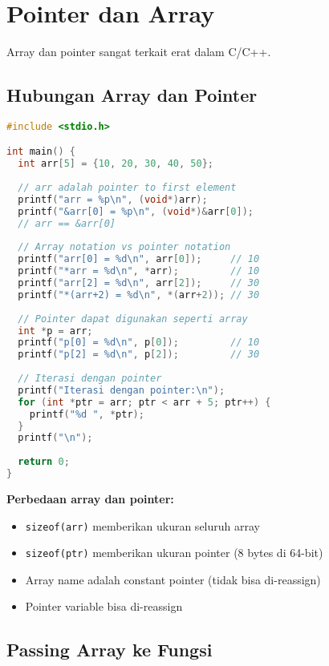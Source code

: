 \documentclass[../main.tex]{subfiles}
\begin{document}
\section{Pointer dan Array}

Array dan pointer sangat terkait erat dalam C/C++.

\subsection{Hubungan Array dan Pointer}

\begin{lstlisting}[language=C, caption={Array dan pointer di C}]
#include <stdio.h>

int main() {
  int arr[5] = {10, 20, 30, 40, 50};
  
  // arr adalah pointer to first element
  printf("arr = %p\n", (void*)arr);
  printf("&arr[0] = %p\n", (void*)&arr[0]);
  // arr == &arr[0]
  
  // Array notation vs pointer notation
  printf("arr[0] = %d\n", arr[0]);     // 10
  printf("*arr = %d\n", *arr);         // 10
  printf("arr[2] = %d\n", arr[2]);     // 30
  printf("*(arr+2) = %d\n", *(arr+2)); // 30
  
  // Pointer dapat digunakan seperti array
  int *p = arr;
  printf("p[0] = %d\n", p[0]);         // 10
  printf("p[2] = %d\n", p[2]);         // 30
  
  // Iterasi dengan pointer
  printf("Iterasi dengan pointer:\n");
  for (int *ptr = arr; ptr < arr + 5; ptr++) {
    printf("%d ", *ptr);
  }
  printf("\n");
  
  return 0;
}
\end{lstlisting}

\textbf{Perbedaan array dan pointer:}
\begin{itemize}
  \item \texttt{sizeof(arr)} memberikan ukuran seluruh array
  \item \texttt{sizeof(ptr)} memberikan ukuran pointer (8 bytes di 64-bit)
  \item Array name adalah constant pointer (tidak bisa di-reassign)
  \item Pointer variable bisa di-reassign
\end{itemize}

\subsection{Passing Array ke Fungsi}
\end{document}
